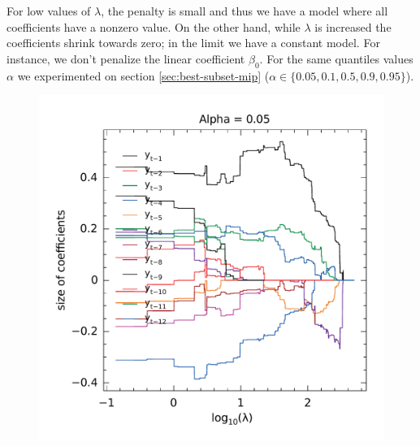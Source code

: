 For low values of $\lambda$, the penalty is small and thus we have a model where all coefficients have a nonzero value. On the other hand, while $\lambda$ is increased the coefficients shrink towards zero; in the limit we have a constant model. For instance, we don't penalize the linear coefficient $\beta_0$. For the same quantiles values $\alpha$ we experimented on section \ref{sec:best-subset-mip} ($\alpha \in \{0.05, 0.1, 0.5, 0.9, 0.95\}$). 


\begin{figure}
  \centering
  \begin{minipage}[t]{0.4\linewidth}
    \centering
    \begin{minipage}[t]{\linewidth}
      \centering     \includegraphics[width=\textwidth]{Figuras/selecao-lasso/par-sellasso-005.pdf}
    \end{minipage}
    \begin{minipage}[b]{\linewidth}

\end{minipage}
\end{minipage}
\end{figure}
